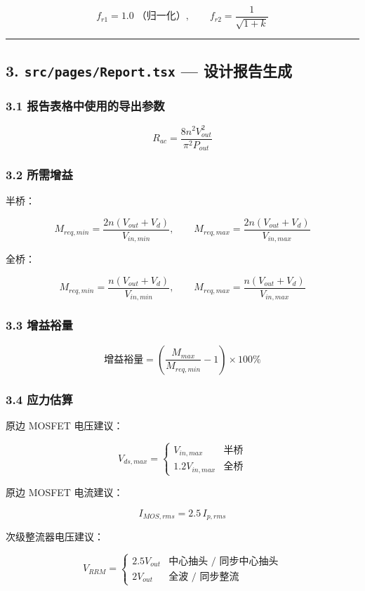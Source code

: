 \documentclass[UTF8]{ctexart}
\begin{document}
\[
f_{r1} = 1.0\;\text{（归一化）},\qquad
f_{r2} = \frac{1}{\sqrt{1+k}}
\]

\noindent\rule{\textwidth}{0.4pt}

\subsection*{3. \texttt{src/pages/Report.tsx} — 设计报告生成}

\subsubsection*{3.1 报告表格中使用的导出参数}

\[
R_{ac} = \frac{8 n^{2} V_{out}^{2}}{\pi^{2} P_{out}}
\]

\subsubsection*{3.2 所需增益}

半桥：

\[
M_{req,min} = \frac{2n(V_{out}+V_d)}{V_{in,min}},\qquad
M_{req,max} = \frac{2n(V_{out}+V_d)}{V_{in,max}}
\]

全桥：

\[
M_{req,min} = \frac{n(V_{out}+V_d)}{V_{in,min}},\qquad
M_{req,max} = \frac{n(V_{out}+V_d)}{V_{in,max}}
\]

\subsubsection*{3.3 增益裕量}

\[
\text{增益裕量} = \left(\frac{M_{max}}{M_{req,min}} - 1\right) \times 100\%
\]

\subsubsection*{3.4 应力估算}

原边 MOSFET 电压建议：

\[
V_{ds,max} = \begin{cases} V_{in,max} & \text{半桥} \\ 1.2 V_{in,max} & \text{全桥} \end{cases}
\]

原边 MOSFET 电流建议：

\[
I_{MOS,rms} = 2.5 \, I_{p,rms}
\]

次级整流器电压建议：

\[
V_{RRM} = \begin{cases} 2.5 V_{out} & \text{中心抽头 / 同步中心抽头} \\ 2 V_{out} & \text{全波 / 同步整流} \end{cases}
\]
\end{document}
